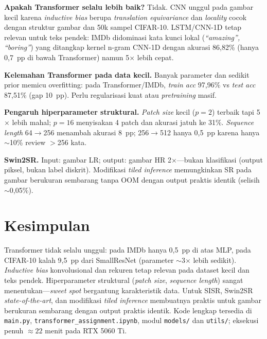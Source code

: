\documentclass[10pt,conference,a4paper]{article}
\begin{document}
\textbf{Apakah Transformer selalu lebih baik?} Tidak. CNN unggul pada gambar kecil karena \emph{inductive bias} berupa \emph{translation equivariance} dan \emph{locality} cocok dengan struktur gambar dan 50k sampel CIFAR-10. LSTM/CNN-1D tetap relevan untuk teks pendek: IMDb didominasi kata kunci lokal (\emph{``amazing'', ``boring''}) yang ditangkap kernel n-gram CNN-1D dengan akurasi 86{,}82\% (hanya 0{,}7~pp di bawah Transformer) namun 5$\times$ lebih cepat.

\textbf{Kelemahan Transformer pada data kecil.} Banyak parameter dan sedikit prior memicu overfitting: pada Transformer/IMDb, \emph{train acc} 97{,}96\% vs \emph{test acc} 87{,}51\% (gap 10~pp). Perlu regularisasi kuat atau \emph{pretraining} masif.

\textbf{Pengaruh hiperparameter struktural.} \emph{Patch size} kecil ($p{=}2$) terbaik tapi 5$\times$ lebih mahal; $p{=}16$ menyisakan 4 patch dan akurasi jatuh ke 31\%. \emph{Sequence length} 64$\to$256 menambah akurasi 8~pp; 256$\to$512 hanya 0{,}5~pp karena hanya $\sim$10\% review $>$256 kata.

\textbf{Swin2SR.} Input: gambar LR; output: gambar HR 2$\times$---bukan klasifikasi (output piksel, bukan label diskrit). Modifikasi \emph{tiled inference} memungkinkan SR pada gambar berukuran sembarang tanpa OOM dengan output praktis identik (selisih $\sim$0{,}05\%).

\section{Kesimpulan}

Transformer tidak selalu unggul: pada IMDb hanya 0{,}5~pp di atas MLP, pada CIFAR-10 kalah 9{,}5~pp dari SmallResNet (parameter $\sim$3$\times$ lebih sedikit). \emph{Inductive bias} konvolusional dan rekuren tetap relevan pada dataset kecil dan teks pendek. Hiperparameter struktural (\emph{patch size}, \emph{sequence length}) sangat menentukan---\emph{sweet spot} bergantung karakteristik data. Untuk SISR, Swin2SR \emph{state-of-the-art}, dan modifikasi \emph{tiled inference} membuatnya praktis untuk gambar berukuran sembarang dengan output praktis identik. Kode lengkap tersedia di \texttt{main.py}, \texttt{transformer\_assignment.ipynb}, modul \texttt{models/} dan \texttt{utils/}; eksekusi penuh $\approx 22$ menit pada RTX 5060 Ti.
\end{document}

